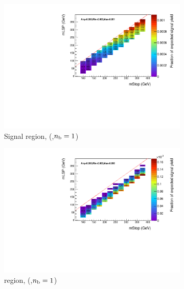 \begin{figure}[p]
\begin{subfigure}[b]{0.47\textwidth}
    \includegraphics[width=\textwidth]{Figs/sms/t2degen/v23/effs/T2_4body_had_eff_maps_eq1b_le3j_SITV.pdf}
    \caption{Signal region, (\njlow,$n_{\text{b}}=1$)}
    \label{fig:t2_4body_sig_eff_le3j_1b}
  \end{subfigure}
  \begin{subfigure}[b]{0.47\textwidth}
    \includegraphics[width=\textwidth]{Figs/sms/t2degen/v23/effs/T2_4body_muon_eff_maps_eq1b_le3j_SITV.pdf}
    \caption{\mj region, (\njlow,$n_{\text{b}}=1$)}
    \label{fig:t2_4body_mu_eff_le3j_1b}
  \end{subfigure} \\
  \begin{subfigure}[b]{0.47\textwidth}

\end{subfigure}
\end{figure}
